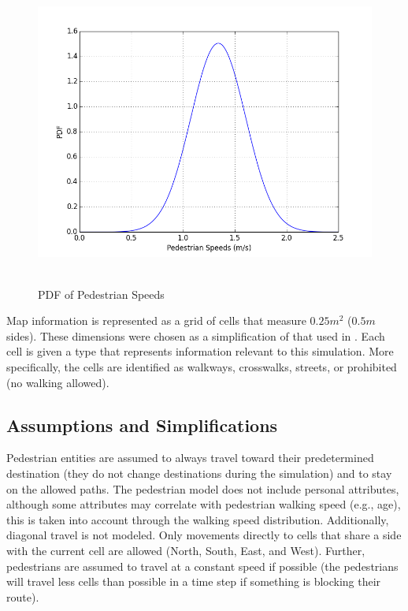 \documentclass[paper=a4, fontsize=11pt]{scrartcl}
\numberwithin{equation}{section}		%
\numberwithin{figure}{section}			%
\numberwithin{table}{section}		    %
\begin{document}
\begin{figure}[h]
	\begin{center} 
		\includegraphics[height=4in,width=5.5in]{speed_dist_pdf} 
		\caption{PDF of Pedestrian Speeds\label{fig:speed}}
	\end{center} 
\end{figure}

\noindent
Map information is represented as a grid of cells that measure $0.25 m^2$ ($0.5 m$ sides). These 
dimensions were chosen as a simplification of that used in \cite{blue2001cellular}. Each cell is 
given a type that represents information relevant to this simulation. More specifically, the cells 
are identified as walkways, crosswalks, streets, or prohibited (no walking allowed).

\subsection{Assumptions and Simplifications} \label{sec:modle_ass}
Pedestrian entities are assumed to always travel toward their predetermined destination (they 
do not change destinations during the simulation) and to stay on the allowed paths. The 
pedestrian model does not include personal attributes, although some attributes may correlate 
with pedestrian walking speed (e.g., age), this is taken into account through the walking speed 
distribution. Additionally, diagonal travel is not modeled. Only movements directly to cells 
that share a side with the current cell are allowed (North, South, East, and West). Further, 
pedestrians are assumed to travel at a constant speed if possible (the pedestrians will travel less 
cells than possible in a time step if something is blocking their route).\\
\end{document}
